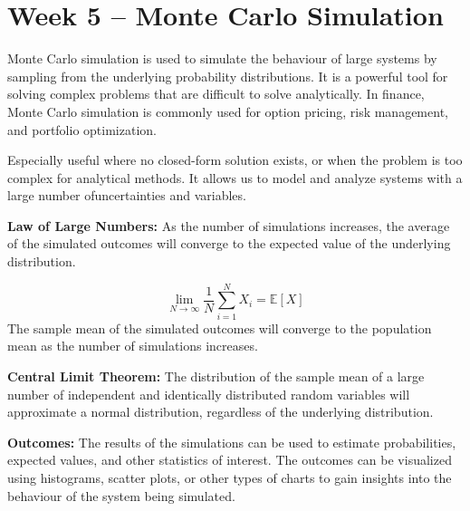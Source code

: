 \section{Week 5 -- Monte Carlo Simulation}
Monte Carlo simulation is used to simulate the behaviour of large systems by
sampling from the underlying probability distributions. It is a powerful tool
for solving complex problems that are difficult to solve analytically. In
finance, Monte Carlo simulation is commonly used for option pricing, risk
management, and portfolio optimization.

Especially useful where no closed-form solution exists, or when the problem is
too complex for analytical methods. It allows us to model and analyze systems
with a large number ofuncertainties and variables.

\textbf{Law of Large Numbers:} As the number of simulations increases, the average of
the simulated outcomes will converge to the expected value of the underlying
distribution.

$$\lim_{N \to \infty} \frac{1}{N} \sum_{i=1}^{N} X_i = \mathbb{E}[X]$$
The sample mean of the simulated outcomes will converge to the population mean as the number of simulations increases.

\textbf{Central Limit Theorem:} The distribution of the sample mean of a large number
of independent and identically distributed random variables will approximate a
normal distribution, regardless of the underlying distribution.

\textbf{Outcomes:} The results of the simulations can be used to estimate
probabilities, expected values, and other statistics of interest. The outcomes
can be visualized using histograms, scatter plots, or other types of charts to
gain insights into the behaviour of the system being simulated.

